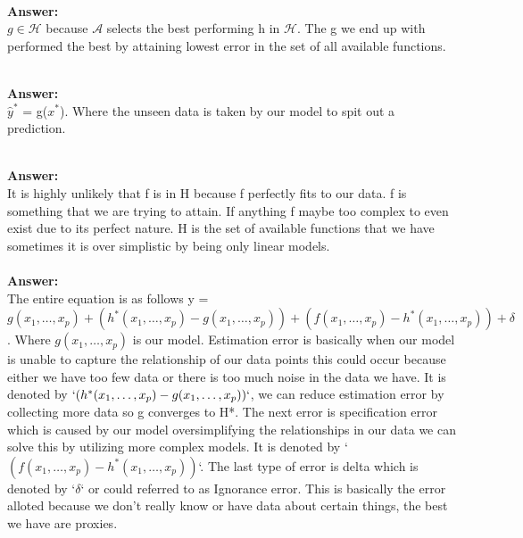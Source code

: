 \documentclass[12pt]{article}
\begin{document}
\begin{enumerate}
 \\
\textbf{Answer: } \\ 
$g \in \mathcal{H}$ because $\mathcal{A}$ selects the best performing h in $\mathcal{H}$. The g we end up with performed the best by attaining lowest error in the set of all available functions. 

 \\
\textbf{Answer: } \\ 
$\hat{y}^*$ = g($x^*$). Where the unseen data is taken by our model to spit out a prediction.

\\
\textbf{Answer: } \\
It is highly unlikely that f is in H because f perfectly fits to our data. f is something that we are trying to attain. If anything f maybe too complex to even exist due to its perfect nature. H is the set of available functions that we have sometimes it is over simplistic by being only linear models.  \\ 

\\
\textbf{Answer: } \\
The entire equation is as follows 
y = $g(x_1, \ldots, x_p) + (h^*(x_1, \ldots, x_p) - g(x_1, \ldots, x_p)) + (f(x_1, \ldots, x_p) - h^*(x_1, \ldots, x_p)) + \delta$. Where $g(x_1, \ldots, x_p)$ is our model. Estimation error is basically when our model is unable to capture the relationship of our data points this could occur because either we have too few data or there is too much noise in the data we have. It is denoted by $`(h^*(x_1, \ldots, x_p) - g(x_1, \ldots, x_p))`$, we can reduce estimation error by collecting more data so g converges to H*. The next error is specification error which is caused by our model oversimplifying the relationships in our data we can solve this by utilizing more complex models. It is denoted by `$(f(x_1, \ldots, x_p) - h^*(x_1, \ldots, x_p))$`. The last type of error is delta which is denoted by `$\delta$` or could referred to as Ignorance error. This is basically the error alloted because we don't really know or have data about certain things, the best we have are proxies. 



\end{enumerate}
\end{document}
